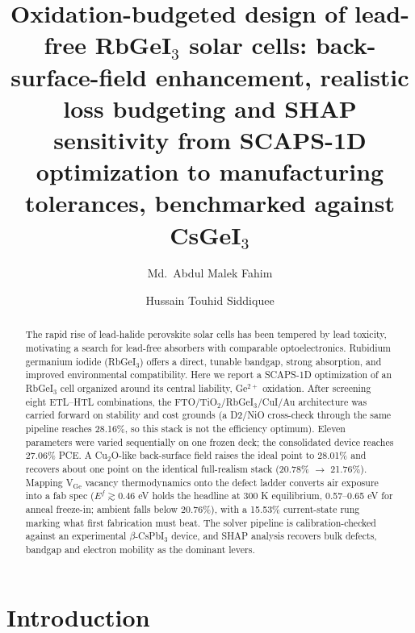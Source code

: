 \documentclass[aip,amsmath,amssymb,preprint]{revtex4-2}
\begin{document}
\title[RbGeI3 solar cells]{Oxidation-budgeted design of lead-free RbGeI$_{3}$ solar cells: back-surface-field enhancement, realistic loss budgeting and SHAP sensitivity from SCAPS-1D optimization to manufacturing tolerances, benchmarked against CsGeI$_{3}$}
\author{Md.\ Abdul Malek Fahim}
\author{Hussain Touhid Siddiquee}
\begin{abstract}
The rapid rise of lead-halide perovskite solar cells has been tempered by lead toxicity, motivating a search for lead-free absorbers with comparable optoelectronics. Rubidium germanium iodide (RbGeI$_{3}$) offers a direct, tunable bandgap, strong absorption, and improved environmental compatibility. Here we report a SCAPS-1D optimization of an RbGeI$_{3}$ cell organized around its central liability, Ge$^{2+}$ oxidation. After screening eight ETL--HTL combinations, the FTO/\allowbreak{}TiO$_{2}$/RbGeI$_{3}$/CuI/\allowbreak{}Au architecture was carried forward on stability and cost grounds (a D2/NiO cross-check through the same pipeline reaches 28.16\%, so this stack is not the efficiency optimum). Eleven parameters were varied sequentially on one frozen deck; the consolidated device reaches 27.06\% PCE. A Cu$_{2}$O-like back-surface field raises the ideal point to 28.01\% and recovers about one point on the identical full-realism stack (20.78\% $\rightarrow$ 21.76\%). Mapping V$_{\mathrm{Ge}}$ vacancy thermodynamics onto the defect ladder converts air exposure into a fab spec ($E^f\gtrsim0.46$ eV holds the headline at 300 K equilibrium, 0.57--0.65 eV for anneal freeze-in; ambient falls below 20.76\%), with a 15.53\% current-state rung marking what first fabrication must beat. The solver pipeline is calibration-checked against an experimental $\beta$-CsPbI$_{3}$ device, and SHAP analysis recovers bulk defects, bandgap and electron mobility as the dominant levers.
\end{abstract}
\maketitle
\section{Introduction}
\end{document}
